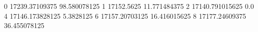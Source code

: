 0 17239.37109375 98.580078125
1 17152.5625 11.771484375
2 17140.791015625 0.0
4 17146.173828125 5.3828125
6 17157.20703125 16.416015625
8 17177.24609375 36.455078125
